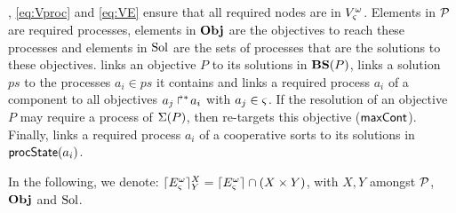 , \eqref{eq:Vproc} and \eqref{eq:VE} ensure that all required nodes are in $V_\varsigma^\omega$.
Elements in $\mathcal{P}$ are required processes,
elements in $\mathbf{Obj}$ are the objectives to reach these processes
and elements in $\mathrm{Sol}$ are the sets of processes that are the solutions to these objectives.
 links an objective $P$ to its solutions in $\mathbf{BS}(P)$,
 links a solution $ps$ to the processes $a_i \in ps$ it contains and
 links a required process $a_i$ of a component to all objectives $\mbox{${a}_{j}\Rsh^*\!{a}_{i}$}$ with $a_j \in \varsigma$.
If the resolution of an objective $P$ may require a process of $\Sigma(P)$, then  re-targets this objective ($\mathsf{maxCont}$).
Finally,  links a required process $a_i$ of a cooperative sorts to its solutions in $\mathsf{procState}(a_i)$.

In the following, we denote:
$\lceil E_\varsigma^\omega\rceil^{X}_{Y} = \lceil E_\varsigma^\omega\rceil \cap (X \times Y)$, with $X, Y$ amongst $\mathcal{P}$, $\mathbf{Obj}$ and $\mathrm{Sol}$.

